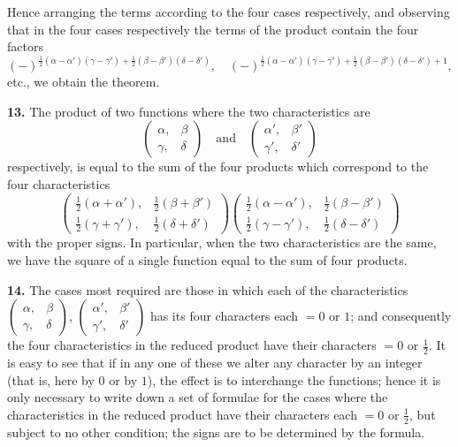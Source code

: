 \documentclass[12pt,a4paper]{article}
\theoremstyle{definition}
\begin{document}
Hence arranging the terms according to the four cases respectively, and observing that in the four cases respectively the terms of the product contain the four factors
\[
(-)^{\frac{1}{2}(\alpha - \alpha')(\gamma - \gamma') + \frac{1}{2}(\beta - \beta')(\delta - \delta')},\quad
(-)^{\frac{1}{2}(\alpha - \alpha')(\gamma - \gamma') + \frac{1}{2}(\beta - \beta')(\delta - \delta') + 1},
\]
etc., we obtain the theorem.

\noindent\textbf{13.}\quad
The product of two functions where the two characteristics are
\[
\begin{pmatrix} \alpha, & \beta \\ \gamma, & \delta \end{pmatrix}\quad \text{and}\quad
\begin{pmatrix} \alpha', & \beta' \\ \gamma', & \delta' \end{pmatrix}
\]
respectively, is equal to the sum of the four products which correspond to the four characteristics
\[
\begin{pmatrix} \tfrac{1}{2}(\alpha + \alpha'), & \tfrac{1}{2}(\beta + \beta') \\ \tfrac{1}{2}(\gamma + \gamma'), & \tfrac{1}{2}(\delta + \delta') \end{pmatrix}
\begin{pmatrix} \tfrac{1}{2}(\alpha - \alpha'), & \tfrac{1}{2}(\beta - \beta') \\ \tfrac{1}{2}(\gamma - \gamma'), & \tfrac{1}{2}(\delta - \delta') \end{pmatrix}
\]
with the proper signs. In particular, when the two characteristics are the same, we have the square of a single function equal to the sum of four products.

\noindent\textbf{14.}\quad
The cases most required are those in which each of the characteristics $\begin{pmatrix} \alpha, & \beta \\ \gamma, & \delta \end{pmatrix}$, $\begin{pmatrix} \alpha', & \beta' \\ \gamma', & \delta' \end{pmatrix}$ has its four characters each $= 0$ or $1$; and consequently the four characteristics in the reduced product have their characters $= 0$ or $\tfrac{1}{2}$. It is easy to see that if in any one of these we alter any character by an integer (that is, here by $0$ or by $1$), the effect is to interchange the functions; hence it is only necessary to write down a set of formulae for the cases where the characteristics in the reduced product have their characters each $= 0$ or $\tfrac{1}{2}$, but subject to no other condition; the signs are to be determined by the formula.
\end{document}
